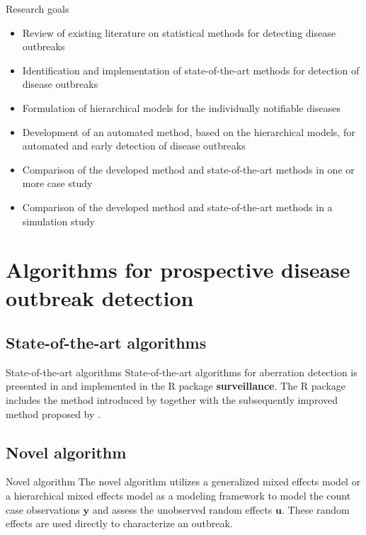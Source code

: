 \documentclass[aspectratio=169,handout]{beamer}
\begin{document}
\begin{frame}{Research goals}
\begin{itemize}
  \item Review of existing literature on statistical methods for detecting disease outbreaks
  \item  Identification and implementation of state-of-the-art methods for detection of disease outbreaks
  \item Formulation of hierarchical models for the individually notifiable diseases
  \item Development of an automated method, based on the hierarchical models, for automated and early detection of disease outbreaks
  \item Comparison of the developed method and state-of-the-art methods in one or more case study
  \item Comparison of the developed method and state-of-the-art methods in a simulation study
\end{itemize}
\end{frame}

\hypertarget{algorithms-for-prospective-disease-outbreak-detection}{%
\section{Algorithms for prospective disease outbreak
detection}\label{algorithms-for-prospective-disease-outbreak-detection}}

\hypertarget{state-of-the-art-algorithms}{%
\subsection{State-of-the-art
algorithms}\label{state-of-the-art-algorithms}}

\begin{frame}{State-of-the-art algorithms}
State-of-the-art algorithms for aberration detection is presented in
\cite{Salmon_2016} and implemented in the R package
\textbf{surveillance}. The R package includes the method introduced by
\cite{Farrington_1996} together with the subsequently improved method
proposed by \cite{Noufaily_2013}.
\end{frame}

\hypertarget{novel-algorithm}{%
\subsection{Novel algorithm}\label{novel-algorithm}}

\begin{frame}{Novel algorithm}
The novel algorithm utilizes a generalized mixed effects model or a
hierarchical mixed effects model as a modeling framework to model the
count case observations \(\boldsymbol y\) and assess the unobserved
random effects \(\boldsymbol u\). These random effects are used directly
to characterize an outbreak.
\end{frame}
\end{document}
